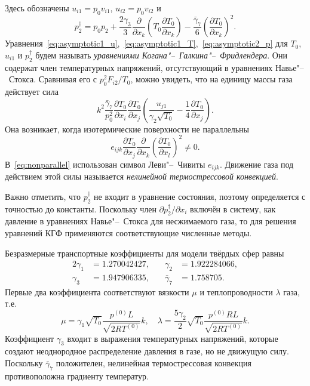 \documentclass[
aps,%
12pt,%
final,%
notitlepage,%
oneside,%
onecolumn,%
nobibnotes,%
nofootinbib,%
superscriptaddress,%
noshowpacs,%
showkeys,%
centertags]%
{revtex4}
\newcommand{\pder}[2][]{\frac{\partial#1}{\partial#2}}
\begin{document}
Здесь обозначены \(u_{i1} = p_0v_{i1}\), \(u_{i2} = p_0v_{i2}\) и
\begin{equation}\label{eq:dag_pressure}
    p_2^\dag = p_0 p_2
        + \frac{2\gamma_3}{3}\pder{x_k}\left(T_0\pder[T_0]{x_k}\right)
        - \frac{\bar{\gamma}_7}{6}\left(\pder[T_0]{x_k}\right)^2.
\end{equation}
Уравнения~\eqref{eq:asymptotic1_u},~\eqref{eq:asymptotic1_T},~\eqref{eq:asymptotic2_p}
для \(T_0\), \(u_{i1}\) и \(p_2^\dag\) будем называть \emph{уравнениями Когана"--~Галкина"--~Фридлендера}.
Они содержат член температурных напряжений, отсутствующий в уравнениях Навье"--~Стокса.
Сравнивая его с \(p_0^2F_{i2}/T_0\), можно увидеть, что на единицу массы газа действует сила
\begin{equation}\label{eq:gamma7_force}
    k^2\frac{\bar{\gamma}_7}{p_0^2}\pder[T_0]{x_i}\pder[T_0]{x_j}\left(\frac{u_{j1}}{\gamma_2\sqrt{T_0}} - \frac{1}4\pder[T_0]{x_j}\right).
\end{equation}
Она возникает, когда изотермические поверхности не параллельны
\begin{equation}\label{eq:nonparallel}
    e_{ijk}\pder[T_0]{x_j}\pder{x_k}\left(\pder[T_0]{x_l}\right)^2 \ne 0.
\end{equation}
В~\eqref{eq:nonparallel} использован символ Леви"--~Чивиты \(e_{ijk}\).
Движение газа под действием этой силы называется \emph{нелинейной термострессовой конвекцией}.

Важно отметить, что \(p_2^\dag\) не входит в уравнение состояния,
поэтому определяется с точностью до константы.
Поскольку член \(\partial{p_2^\dag}/\partial{x_i}\) включён в систему,
как давление в уравнениях Навье"--~Стокса для несжимаемого газа,
то для решения уравнений КГФ применяются соответствующие численные методы.

Безразмерные транспортные коэффициенты для модели твёрдых сфер равны
\begin{alignat*}{2}\label{eq:gamma_coeffs}
    \gamma_1 &= 1.270042427, &\quad \gamma_2 &= 1.922284066, \\
    \gamma_3 &= 1.947906335, &\quad \bar{\gamma}_7 &= 1.758705.
\end{alignat*}
Первые два коэффициента соответствуют вязкости \(\mu\) и теплопроводности \(\lambda\) газа, т.е.
\begin{equation}\label{eq:mu_lambda}
    \mu = \gamma_1\sqrt{T_0} \frac{p^{(0)}L}{\sqrt{2RT^{(0)}}} k, \quad
    \lambda = \frac{5\gamma_2}{2}\sqrt{T_0} \frac{p^{(0)}RL}{\sqrt{2RT^{(0)}}} k.
\end{equation}
Коэффициент \(\gamma_3\) входит в выражения температурных напряжений,
которые создают неоднородное распределение давления в газе,
но не движущую силу. Поскольку \(\bar{\gamma}_7\) положителен,
нелинейная термострессовая конвекция противоположна градиенту температур.
\end{document}
